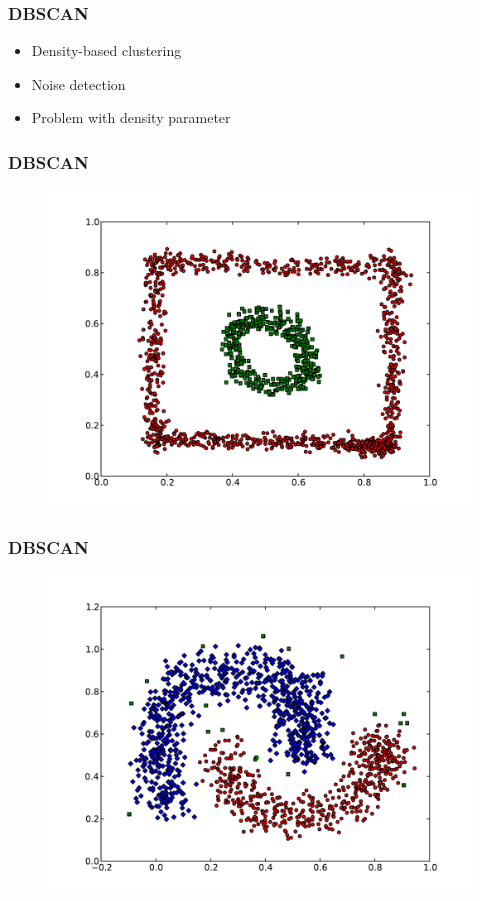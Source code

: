 \documentclass{beamer}
\begin{document}
\begin{frame}
\frametitle{DBSCAN}
    \begin{itemize}
	\item Density-based clustering
    	\item Noise detection
   	\item Problem with density parameter
    \end{itemize}
\end{frame}

\begin{frame}
\frametitle{DBSCAN}
    \begin{figure}[]
    \includegraphics[scale=0.5]{dbscan_circle-weird.pdf}
    \end{figure}
\end{frame}

\begin{frame}
\frametitle{DBSCAN}
    \begin{figure}[]
    \includegraphics[scale=0.5]{dbscan_half-moons.pdf}
    \end{figure}
\end{frame}
\end{document}
